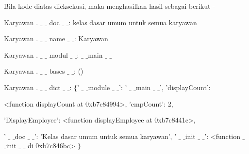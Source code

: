 {Bila kode diatas dieksekusi, maka menghasilkan hasil sebagai berikut - \par
\vspace{12pt}
\noindent 
Karyawan . $  \_  $ $  \_  $ doc $  \_  $ $  \_  $: kelas dasar umum untuk semua karyawan \par
\noindent 
Karyawan . $  \_  $ $  \_  $ name $  \_  $ $  \_  $: Karyawan \par
\noindent 
Karyawan . $  \_  $ $  \_  $ modul $  \_  $ $  \_  $:  $  \_  $ $  \_  $main $  \_  $ $  \_  $ \par
\noindent 
Karyawan . $  \_  $ $  \_  $ bases $  \_  $ $  \_  $: () \par
\noindent 
Karyawan . $  \_  $ $  \_  $ dict $  \_  $ $  \_  $:  $  \{  $' $  \_  $ $  \_  $module $  \_  $ $  \_  $': ' $  \_  $ $  \_  $main $  \_  $ $  \_  $', 'displayCount': \par
\noindent 
<function displayCount at 0xb7c84994>, 'empCount': 2, \par
\noindent 
'DisplayEmployee': <function displayEmployee at 0xb7c8441c>, \par
\noindent 
' $  \_  $ $  \_  $doc $  \_  $ $  \_  $': 'Kelas dasar umum untuk semua karyawan', \pa
\noindent 
' $  \_  $ $  \_  $init $  \_  $ $  \_  $': <function  $  \_  $ $  \_  $init $  \_  $ $  \_  $ di 0xb7c846bc> $  \}  $ \par
\vspace{12pt}
\noindent 

}
